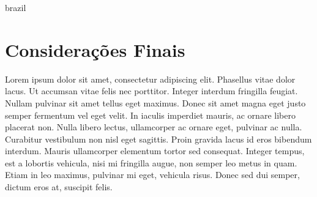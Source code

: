 \begin{otherlanguage*}{brazil}
        \section*{Considerações Finais}
        Lorem ipsum dolor sit amet, consectetur adipiscing elit. Phasellus vitae dolor lacus. Ut
        accumsan vitae felis nec porttitor. Integer interdum fringilla feugiat. Nullam pulvinar sit
        amet tellus eget maximus. Donec sit amet magna eget justo semper fermentum vel eget velit.
        In iaculis imperdiet mauris, ac ornare libero placerat non. Nulla libero lectus, ullamcorper
        ac ornare eget, pulvinar ac nulla. Curabitur vestibulum non nisl eget sagittis. Proin
        gravida lacus id eros bibendum interdum. Mauris ullamcorper elementum tortor sed consequat.
        Integer tempus, est a lobortis vehicula, nisi mi fringilla augue, non semper leo metus in
        quam. Etiam in leo maximus, pulvinar mi eget, vehicula risus. Donec sed dui semper, dictum
        eros at, suscipit felis.


    \end{otherlanguage*}


\else
\fi



\makeatother

